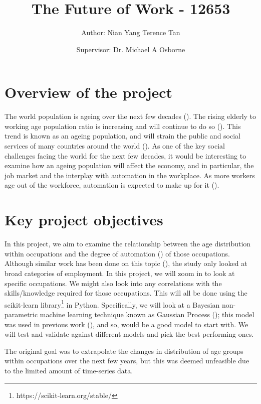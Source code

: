 \documentclass[11pt]{article}
\title{The Future of Work - 12653}
\author{Author: Nian Yang Terence Tan \and Supervisor: Dr. Michael A Osborne}
\begin{document}
\maketitle


\section{Overview of the project}
The world population is ageing over the next few decades (\cite{science}). The rising elderly to working age population ratio is increasing and will continue to do so (\cite{WHO}). This trend is known as an ageing population, and will strain the public and social services of many countries around the world (\cite{publicservicesstrain}). As one of the key social challenges facing the world for the next few decades, it would be interesting to examine how an ageing population will affect the economy, and in particular, the job market and the interplay with automation in the workplace. As more workers age out of the workforce, automation is expected to make up for it (\cite{futureofemployment}).



\section{Key project objectives}
In this project, we aim to examine the relationship between the age distribution within occupations and the degree of automation (\cite{futureofemployment}) of those occupations. Although similar work has been done on this topic (\cite{twinthreats}), the study only looked at broad categories of employment. In this project, we will zoom in to look at specific occupations. We might also look into any correlations with the skills/knowledge required for those occupations. This will all be done using the scikit-learn library\footnote{https://scikit-learn.org/stable/} in Python. Specifically, we will look at a Bayesian non-parametric machine learning technique known as Gaussian Process (\cite{GaussianProcess}); this model was used in previous work (\cite{futureofemployment}), and so, would be a good model to start with. We will test and validate against different models and pick the best performing ones.

The original goal was to extrapolate the changes in distribution of age groups within occupations over the next few years, but this was deemed unfeasible due to the limited amount of time-series data.
\end{document}
